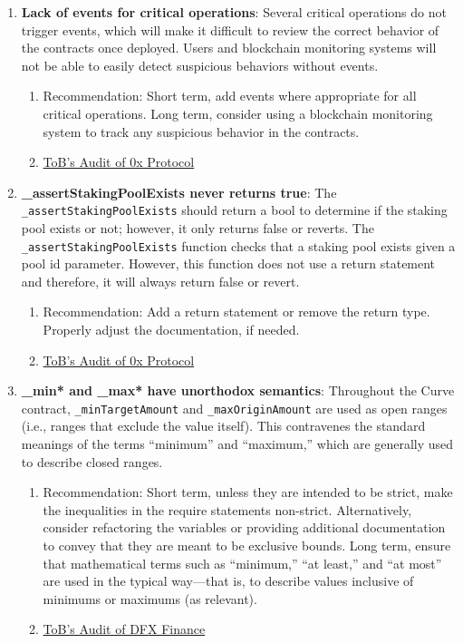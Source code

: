 \begin{enumerate}
\item\textbf{Lack of events for critical operations}: Several critical operations do not trigger events, which will make it difficult to review the correct behavior of the contracts once deployed. Users and blockchain monitoring systems will not be able to easily detect suspicious behaviors without events.
	\begin{enumerate}
	\item Recommendation: Short term, add events where appropriate for all critical operations. Long term, consider using a blockchain monitoring system to track any suspicious behavior in the contracts.
	\item\href{https://github.com/trailofbits/publications/blob/master/reviews/0x-protocol.pdf}{ToB's Audit of 0x Protocol}
	\end{enumerate}

\item\textbf{\_assertStakingPoolExists never returns true}: The \verb|_assertStakingPoolExists| should return a bool to determine if the staking pool exists or not; however, it only returns false or reverts. The \verb|_assertStakingPoolExists| function checks that a staking pool exists given a pool id parameter. However, this function does not use a return statement and therefore, it will always return false or revert.
	\begin{enumerate}
	\item Recommendation: Add a return statement or remove the return type. Properly adjust the documentation, if needed.
	\item\href{https://github.com/trailofbits/publications/blob/master/reviews/0x-protocol.pdf}{ToB's Audit of 0x Protocol}
	\end{enumerate}

\item\textbf{\_min* and \_max* have unorthodox semantics}: Throughout the Curve contract, \verb|_minTargetAmount| and \verb|_maxOriginAmount| are used as open ranges (i.e., ranges that exclude the value itself). This contravenes the standard meanings of the terms “minimum” and “maximum,” which are generally used to describe closed ranges.
	\begin{enumerate}
	\item Recommendation: Short term, unless they are intended to be strict, make the inequalities in the require statements non-strict. Alternatively, consider refactoring the variables or providing additional documentation to convey that they are meant to be exclusive bounds. Long term, ensure that mathematical terms such as “minimum,” “at least,” and “at most” are used in the typical way—that is, to describe values inclusive of minimums or maximums (as relevant).
	\item\href{https://github.com/dfx-finance/protocol/blob/main/audits/2021-05-03-Trail\_of\_Bits.pdf}{ToB's Audit of DFX Finance}
	\end{enumerate}


\end{enumerate}
